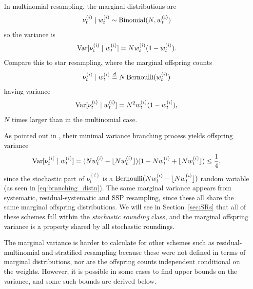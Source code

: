 In multinomial resampling, the marginal distributions are
\begin{equation*}
\nu_t^{(i)} \mid w_t^{(i)} 
\sim \operatorname{Binomial}(N, w_t^{(i)})
\end{equation*}
so the variance is
\begin{equation*}
\operatorname{Var}[ \nu_t^{(i)} \mid w_t^{(i)} ]
= N w_t^{(i)} ( 1- w_t^{(i)} ) .
\end{equation*}
Compare this to star resampling, where the marginal offspring counts
\begin{equation*}
\nu_t^{(i)} \mid w_t^{(i)} 
\overset{d}{=} N \operatorname{Bernoulli}( w_t^{(i)} )
\end{equation*}
having variance
\begin{equation*}
\operatorname{Var}[ \nu_t^{(i)} \mid w_t^{(i)} ]
= N^2 w_t^{(i)} ( 1- w_t^{(i)} ) ,
\end{equation*}
$N$ times larger than in the multinomial case.

As pointed out in \textcite[p.557]{crisan1999}, their minimal variance branching process yields offspring variance
\begin{equation*}
\operatorname{Var}[ \nu_t^{(i)} \mid w_t^{(i)} ]
= ( Nw_t^{(i)} -\lfloor N w_t^{(i)} \rfloor )(1- Nw_t^{(i)} + \lfloor N w_t^{(i)} \rfloor) 
\leq \frac{1}{4} ,
\end{equation*}
since the stochastic part of $\nu_t^{(i)}$ is a $\operatorname{Bernoulli}( Nw_t^{(i)} -\lfloor N w_t^{(i)} \rfloor )$ random variable (as seen in \eqref{eq:branching_distn}).
The same marginal variance appears from systematic, residual-systematic and SSP resampling, since these all share the same marginal offspring distributions. We will see in Section~\ref{sec:SRs} that all of these schemes fall within the \emph{stochastic rounding} class, and the marginal offspring variance is a property shared by all stochastic roundings.

The marginal variance is harder to calculate for other schemes such as residual-multinomial and stratified resampling because these were not defined in terms of marginal distributions, nor are the offspring counts independent conditional on the weights.
However, it is possible in some cases to find upper bounds on the variance, and some such bounds are derived below.

